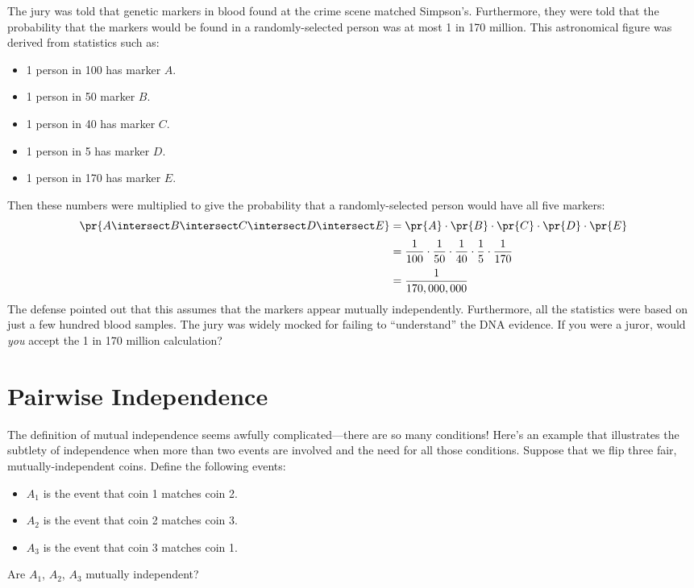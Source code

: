 The jury was told that genetic markers in blood found at the crime
scene matched Simpson's.  Furthermore, they were told that the
probability that the markers would be found in a randomly-selected
person was at most 1 in 170 million.  This astronomical figure was
derived from statistics such as:
%
\begin{itemize}
\item 1 person in 100 has marker $A$.
\item 1 person in 50 marker $B$.
\item 1 person in 40 has marker $C$.
\item 1 person in 5 has marker $D$.
\item 1 person in 170 has marker $E$.
\end{itemize}
%
Then these numbers were multiplied to give the probability that a
randomly-selected person would have all five markers:
%
\begin{align*}
\pr{A \intersect B \intersect C \intersect D \intersect E}
    & = \pr{A} \cdot \pr{B} \cdot \pr{C} \cdot \pr{D} \cdot \pr{E} \\[2pt]
    & = \frac{1}{100} \cdot \frac{1}{50} \cdot \frac{1}{40}
                      \cdot \frac{1}{5} \cdot \frac{1}{170} \\[2pt]
    & = \frac{1}{170,000,000}
\end{align*}
%
The defense pointed out that this assumes that the markers appear
mutually independently.  Furthermore, all the statistics were based on
just a few hundred blood samples.  The jury was widely mocked for
failing to ``understand'' the DNA evidence.  If you were a juror,
would \emph{you} accept the 1 in 170 million calculation?

\section{Pairwise Independence}

The definition of mutual independence seems awfully
complicated---there are so many conditions!  Here's an example that
illustrates the subtlety of independence when more than two events are
involved and the need for all those conditions.  Suppose that we flip
three fair, mutually-independent coins.  Define the following events:
%
\begin{itemize}
\item $A_1$ is the event that coin 1 matches coin 2.
\item $A_2$ is the event that coin 2 matches coin 3.
\item $A_3$ is the event that coin 3 matches coin 1.
\end{itemize}
%
Are $A_1$, $A_2$, $A_3$ mutually independent?

